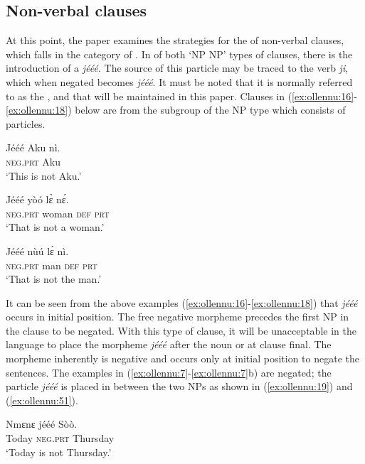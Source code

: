 \documentclass[output=paper,newtxmath,modfonts,nonflat,draftmode]{langsci/langscibook}
\begin{document}
\subsection{\label{sec:ollennu:2.1} Non-verbal clauses}

At this point, the paper examines the strategies for the  of non-verbal clauses, which falls in the category of . In  of both ‘NP NP’ types of clauses, there is the introduction of a  \textit{jééé}. The source of this particle may be traced to the  verb \textit{ji}, which when negated becomes \textit{jééé}. It must be noted that it is normally referred to as the , and that will be maintained in this paper. Clauses in (\ref{ex:ollennu:16}-\ref{ex:ollennu:18}) below are from the subgroup of the NP type which consists of particles.

\ea \label{ex:ollennu:16}
\gll Jééé Aku nì.\\
\textsc{neg}.\textsc{prt} Aku\\
\glt `This is not Aku.'
\z

\ea \label{ex:ollennu:17}
\gll Jééé yòó l\`ɛ n\'ɛ.\\
\textsc{neg}.\textsc{prt} woman \textsc{def} \textsc{prt}\\
\glt `That is not a woman.'
\z

\ea \label{ex:ollennu:18}
\gll Jééé nù\'u l\`ɛ nì.\\
\textsc{neg}.\textsc{prt} man \textsc{def} \textsc{prt}\\
\glt ‘That is not the man.’
\z

It can be seen from the above examples (\ref{ex:ollennu:16}-\ref{ex:ollennu:18}) that \textit{jééé} occurs in initial position. The free negative morpheme precedes the first NP in the clause to be negated. With this type of clause, it will be unacceptable in the  language to place the morpheme \textit{jééé} after the noun or at clause final. The morpheme inherently is negative and occurs only at initial position to negate the sentences. The examples in (\ref{ex:ollennu:7}-\ref{ex:ollennu:7}b) are negated; the particle \textit{jééé} is placed in between the two NPs as shown in (\ref{ex:ollennu:19}) and (\ref{ex:ollennu:51}).

\ea \label{ex:ollennu:19}
\gll Nmɛnɛ jééé Sòò.\\
Today \textsc{neg}.\textsc{prt} Thursday\\
\glt `Today is not Thursday.'
\z
\end{document}
